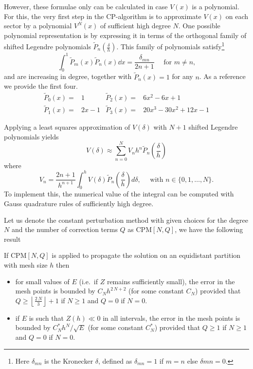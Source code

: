 
However, these formulae only can be calculated in case $V(x)$ is a polynomial. For this, the very first step in the CP-algorithm is to approximate $V(x)$ on each sector by a polynomial $V^{N}(x)$ of sufficient high degree $N$. One possible polynomial representation is by expressing it in terms of the orthogonal family of shifted Legendre polynomials $\widetilde{P}_n(\frac{\delta}{h})$. This family of polynomials satisfy\footnote{Here $\delta_{mn}$ is the Kronecker $\delta$, defined as $\delta_{mn} = 1$ if $m=n$ else $\delta{mn} = 0$.}
$$
\int_0^1 \widetilde{P}_m(x) \widetilde{P}_n(x) \dd x = \frac{\delta_{mn}}{2n + 1} \quad\text{ for $m \neq n$,}
$$
and are increasing in degree, together with $\widetilde{P}_n(x) = 1$ for any $n$. As a reference we provide the first four.
\begin{align*}
    \widetilde{P}_0(x) =& 1 & \widetilde{P}_2(x) =&6x^2 - 6x + 1 \\
    \widetilde{P}_1(x) =& 2x - 1 & \widetilde{P}_3(x) =&20 x^3 - 30 x^2 +12 x - 1
\end{align*}

Applying a least squares approximation of $V(\delta)$ with $N + 1$ shifted Legendre polynomials yields
$$
V(\delta) \approx \sum_{n=0}^N V_n h^n \widetilde{P}_n(\frac{\delta}{h})
$$
where
\begin{equation}\label{equ:c2_legendre_V}
    V_n= \frac{2 n + 1}{h^{n+1}} \int_0^h V(\delta) \widetilde{P}_n(\frac{\delta}{h}) d \delta, \quad \text{ with $n \in \{0, 1,\dots, N\}$.}
\end{equation}
To implement this, the numerical value of the integral can be computed with Gauss quadrature rules of sufficiently high degree.

Let us denote the constant perturbation method with given choices for the degree $N$ and the number of correction terms $Q$ as CPM$[N,Q]$, we have the following result \cite{ixaru_cp_1998}

\begin{theorem}\label{the:c2_h_error_estimate}
    If $\text{CPM}[N,Q]$ is applied to propagate the solution on an equidistant partition with mesh size $h$ then
    \begin{itemize}
        \item for small values of $E$ (i.e.\ if $Z$ remains sufficiently small), the error in the mesh points is bounded by $C_N h^{2\,N+2}$ (for some constant $C_N$) provided that $Q \geq \left\lfloor \frac{2\,N}{3} \right\rfloor +1$ if $N \geq 1$ and $Q=0$ if $N=0$.
        \item if $E$ is such that $Z(h)\ll 0$ in all intervals, the error in the mesh points is bounded by $C^*_N h^{N}/ \sqrt{E}$  (for some constant $C^*_N$) provided that $Q \geq 1$  if $N \geq 1$ and $Q=0$ if $N=0$.
    \end{itemize}
\end{theorem}

